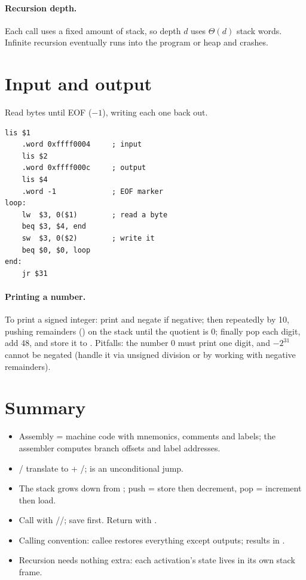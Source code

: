 \paragraph{Recursion depth.} Each call uses a fixed amount of stack, so depth $d$ uses
$\Theta(d)$ stack words. Infinite recursion eventually runs  into the program or
heap and crashes.

\section{Input and output}

\begin{example}
Read bytes until EOF ($-1$), writing each one back out.
\begin{lstlisting}[style=mips]
    lis $1
    .word 0xffff0004     ; input
    lis $2
    .word 0xffff000c     ; output
    lis $4
    .word -1             ; EOF marker
loop:
    lw  $3, 0($1)        ; read a byte
    beq $3, $4, end
    sw  $3, 0($2)        ; write it
    beq $0, $0, loop
end:
    jr $31
\end{lstlisting}
\end{example}

\paragraph{Printing a number.} To print a signed integer: print \code{-} and negate if
negative; then repeatedly  by 10, pushing remainders () on the stack
until the quotient is 0; finally pop each digit, add 48, and store it to .
Pitfalls: the number 0 must print one digit, and $-2^{31}$ cannot be negated (handle it via
unsigned division or by working with negative remainders).

\section{Summary}
\begin{itemize}
  \item Assembly = machine code with mnemonics, comments and labels; the assembler computes
        branch offsets and label addresses.
  \item {}/ translate to  + /;
         is an unconditional jump.
  \item The stack grows down from ; push = store then decrement, pop = increment then load.
  \item Call with //; save  first. Return with .
  \item Calling convention: callee restores everything except outputs; results in .
  \item Recursion needs nothing extra: each activation's state lives in its own stack frame.
\end{itemize}
